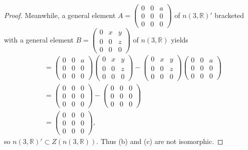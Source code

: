 \documentclass[12pt]{article}
\theoremstyle{definition}
\begin{document}
\begin{proof}
  Meanwhile, a general element $A = \begin{pmatrix} 0 & 0 & a \\ 0 & 0 & 0 \\ 0 & 0 & 0 \end{pmatrix}$ of $n(3, \mathbb{R})'$ bracketed with a general element $B = \begin{pmatrix} 0 & x & y \\ 0 & 0 & z \\ 0 & 0 & 0 \end{pmatrix}$ of $n(3, \mathbb{R})$ yields \begin{align*}
      [A, B] & = \begin{pmatrix} 0 & 0 & a \\ 0 & 0 & 0 \\ 0 & 0 & 0 \end{pmatrix}\begin{pmatrix} 0 & x & y \\ 0 & 0 & z \\ 0 & 0 & 0 \end{pmatrix} - \begin{pmatrix} 0 & x & y \\ 0 & 0 & z \\ 0 & 0 & 0 \end{pmatrix}\begin{pmatrix} 0 & 0 & a \\ 0 & 0 & 0 \\ 0 & 0 & 0 \end{pmatrix} \\
      & = \begin{pmatrix} 0 & 0 & 0 \\ 0 & 0 & 0 \\ 0 & 0 & 0 \end{pmatrix} - \begin{pmatrix} 0 & 0 & 0 \\ 0 & 0 & 0 \\ 0 & 0 & 0 \end{pmatrix} \\
      & = \begin{pmatrix} 0 & 0 & 0 \\ 0 & 0 & 0 \\ 0 & 0 & 0 \end{pmatrix},
  \end{align*}
  so $n(3, \mathbb{R})' \subset Z(n(3, \mathbb{R}))$.
  Thus (b) and (c) are not isomorphic.
\end{proof}
\end{document}
